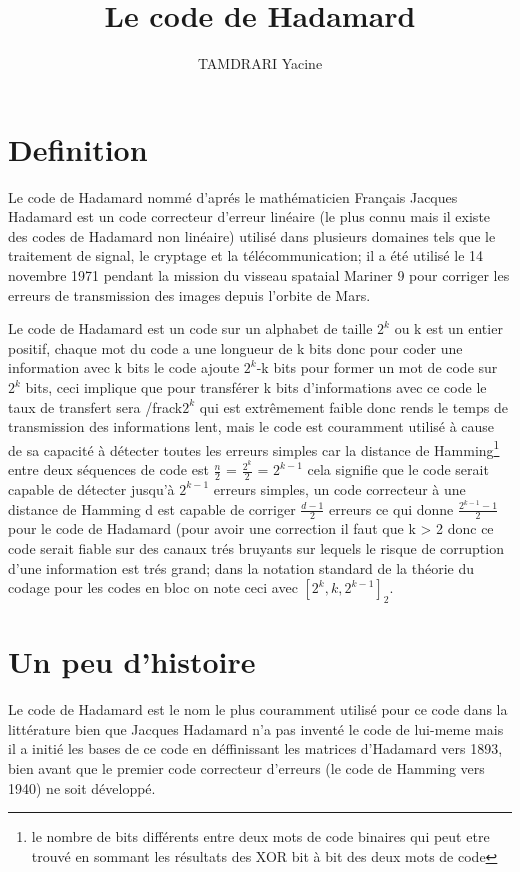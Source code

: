 \documentclass{article}
\author{TAMDRARI Yacine}
\title{Le code de Hadamard}
\begin{document}
\maketitle
\titlepage
\tableofcontents
\newpage

\section{Definition}
Le code de Hadamard nommé d'aprés le mathématicien Français Jacques 
Hadamard est un code correcteur d'erreur linéaire (le plus connu mais il 
existe des codes de Hadamard non linéaire) utilisé dans plusieurs 
domaines tels que le traitement de signal, le cryptage et la 
télécommunication; il a été utilisé le 14 novembre 1971 pendant la mission
du visseau spataial Mariner 9 pour corriger les erreurs de transmission des
images depuis l'orbite de Mars.

Le code de Hadamard est un code sur un alphabet de taille $2^k$ ou k est un
entier positif, chaque mot du code a une longueur de k bits donc pour coder
une information avec k bits le code ajoute $2^k$-k bits pour former un mot
de code sur $2^k$ bits, ceci implique que pour transférer k bits 
d'informations avec ce code le taux de transfert sera /frac{k}{$2^k$} qui 
est extrêmement faible donc rends le temps de transmission des informations
lent, mais le code est couramment utilisé à cause de sa capacité à détecter
toutes les erreurs simples car la distance de Hamming\footnote{le nombre 
de bits différents entre deux mots de code binaires qui peut etre trouvé en
sommant les résultats des XOR bit à bit des deux mots de code} entre deux séquences de code est $\frac{n}{2}$ = $\frac{2^k}{2}$ = $2^{k-1}$ cela 
signifie que le code serait capable de détecter jusqu'à $2^{k-1}$ erreurs 
simples, un code correcteur à une distance de Hamming d est capable de 
corriger $\frac{d-1}{2}$ erreurs ce qui donne $\frac{2^{k-1}-1}{2}$ pour le
code de Hadamard (pour avoir une correction il faut que k > 2 donc ce code 
serait fiable sur des canaux trés bruyants sur lequels le risque de 
corruption d'une information est trés grand; dans la notation standard de 
la théorie du codage pour les codes en bloc on note ceci avec 
$[2^k, k, 2^{k-1}]_2$.

\section{Un peu d'histoire}
Le code de Hadamard est le nom le plus couramment utilisé pour ce code dans
la littérature bien que Jacques Hadamard n'a pas inventé le code de 
lui-meme mais il a initié les bases de ce code en déffinissant les matrices
d'Hadamard vers 1893, bien avant que le premier code correcteur d'erreurs
(le code de Hamming vers 1940) ne soit développé.
\end{document}
